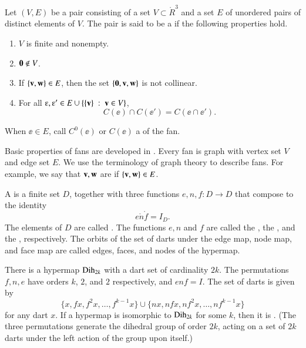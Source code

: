\documentclass{llncs}
\def\op#1{{\hbox{#1}}}
\begin{document}
\begin{definition}\label{def:fan}
Let $(V,E)$ be a pair consisting of a set $V\subset \ring{R}^3$ and
a set $E$ of unordered pairs of distinct elements of $V$.  The pair
is said to be a  if the following properties hold.
\begin{enumerate}
\item {} $V$ is finite and  nonempty.
\item {} ${\mathbf 0}\not\in V$.
\item {} If $\{{\mathbf v},{\mathbf w}\} \in E$, then the set
$\{{\mathbf 0},{\mathbf v},{\mathbf w}\}$ is not collinear.
\item {}
For all $\ee ,\ee '\in E \cup \{\{\v\}\mid \v\in V\}$, 
\[ C(\ee )\cap C(\ee ') = C(\ee \cap \ee
').\] 
\end{enumerate}
When $\ee\in E$, call $C^0(\ee)$ or $C(\ee)$ a 
of the fan.  
\end{definition}

Basic properties of fans are developed in \cite[Ch.~5]{DSP}.
Every fan is graph with vertex set $V$ and edge set $E$.
We use the terminology of graph theory to describe fans.  For example,
we say that ${\mathbf v},{\mathbf w}$ are  if $\{{\mathbf v},{\mathbf w}\}\in E$.


\begin{definition}[hypermap]   A  is a finite set $D$, together with three functions
  $e,n,f:D\to D$ that compose to the identity
  \[ 
e\ocirc n\ocirc f = I_D.
\]  The
elements of $D$ are called .  The functions $e,n$ and
$f$ are called the , the , and
the , respectively. 
The orbits of the set of darts under the edge map, node map, and face map are called edges, faces, and nodes of the hypermap.
\end{definition}

\begin{example}[dihedral]\label{ex:D2k} 
There is a hypermap $\op{Dih}_{2k}$ with a dart set of cardinality $2k$.
The permutations $f,n,e$ have  orders $k$, $2$, and $2$ respectively, and 
$e n f = I$.
The set of darts is given by
\[ 
\{x, f x,f^2 x,\ldots,f^{k-1} x\}\cup \{n x, n f x, n f^2 x,\ldots, n f^{k-1} x\}
\] 
for any dart $x$.
If a hypermap is isomorphic to $\op{Dih}_{2k}$ for
some $k$, then it is .
(The three permutations generate the dihedral
group of order $2k$, acting on a set of $2k$ darts under the left action of the group upon itself.) 
%
\end{example}
\end{document}
